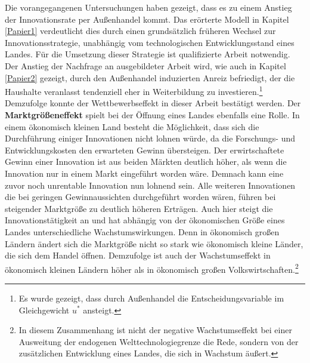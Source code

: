Die vorangegangenen Untersuchungen haben gezeigt, dass es zu einem Anstieg der Innovationsrate per Au{\ss}enhandel kommt. Das er{\"o}rterte Modell in Kapitel \ref{Papier1} verdeutlicht dies durch einen grunds{\"a}tzlich fr{\"u}heren Wechsel zur Innovationsstrategie, unabh{\"a}ngig vom technologischen Entwicklungsstand eines Landes. F{\"u}r die Umsetzung dieser Strategie ist qualifizierte Arbeit notwendig. Der Anstieg der Nachfrage an ausgebildeter Arbeit wird, wie auch in Kapitel \ref{Papier2} gezeigt, durch den Au{\ss}enhandel induzierten Anreiz befriedigt, der die Haushalte veranlasst tendenziell eher in Weiterbildung zu investieren.\footnote{Es wurde gezeigt, dass durch Au{\ss}enhandel die Entscheidungsvariable im Gleichgewicht $u^*$ ansteigt.} Demzufolge konnte der Wettbewerbseffekt in dieser Arbeit best{\"a}tigt werden. \newline
Der \textbf{Marktgr{\"o}{\ss}eneffekt} spielt bei der {\"O}ffnung eines Landes ebenfalls eine Rolle. In einem {\"o}konomisch kleinen Land besteht die M{\"o}glichkeit, dass sich die Durchf{\"u}hrung einiger Innovationen nicht lohnen w{\"u}rde, da die Forschungs- und Entwicklungskosten den erwarteten Gewinn {\"u}bersteigen. Der erwirtschaftete Gewinn einer Innovation ist aus beiden M{\"a}rkten  deutlich h{\"o}her, als wenn die Innovation nur in einem Markt eingef{\"u}hrt worden w{\"a}re. Demnach kann eine zuvor noch unrentable Innovation nun lohnend sein. Alle weiteren Innovationen die bei geringen Gewinnaussichten durchgef{\"u}hrt worden w{\"a}ren, f{\"u}hren bei steigender Marktgr{\"o}{\ss}e zu deutlich h{\"o}heren Ertr{\"a}gen.
Auch hier steigt die Innovationst{\"a}tigkeit an und hat abh{\"a}ngig von der {\"o}konomischen Gr{\"o}{\ss}e eines Landes unterschiedliche Wachstumswirkungen. Denn in {\"o}konomisch gro{\ss}en L{\"a}ndern {\"a}ndert sich die Marktgr{\"o}{\ss}e nicht so stark wie {\"o}konomisch kleine L{\"a}nder, die sich dem Handel {\"o}ffnen. Demzufolge ist auch der Wachstumseffekt in {\"o}konomisch kleinen L{\"a}ndern h{\"o}her als in {\"o}konomisch gro{\ss}en Volkswirtschaften.\footnote{In diesem Zusammenhang ist nicht der negative Wachstumseffekt bei einer Ausweitung der endogenen Welttechnologiegrenze die Rede, sondern von der zus{\"a}tzlichen Entwicklung eines Landes, die sich in Wachstum {\"a}u{\ss}ert.}\\


